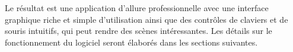 Le résultat est une application d'allure professionnelle avec une interface graphique riche et simple d’utilisation ainsi que des contrôles de claviers et de souris intuitifs, qui peut rendre des scènes intéressantes.
Les détails sur le fonctionnement du logiciel seront élaborés dans les sections suivantes.
